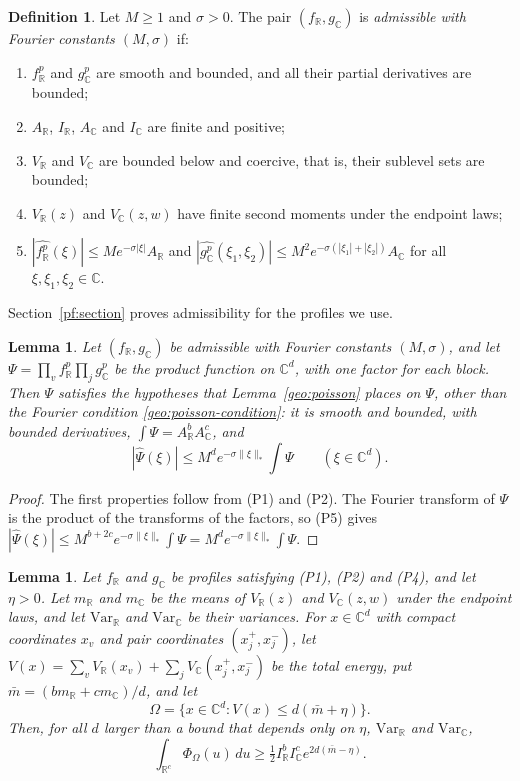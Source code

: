 \documentclass[11pt]{amsart}
\numberwithin{equation}{section}
\newtheorem{lemma}[equation]{Lemma}
\theoremstyle{definition}
\newtheorem{definition}[equation]{Definition}
\theoremstyle{remark}
\newcommand{\R}{\mathbb R}
\newcommand{\C}{\mathbb C}
\begin{document}
\begin{definition}\label{geo:admissible}
Let $M\ge1$ and $\sigma>0$. The pair $(f_\R,g_\C)$ is \emph{admissible
with Fourier constants $(M,\sigma)$} if:
\begin{enumerate}
\item[(P1)] $f_\R^p$ and $g_\C^p$ are smooth and bounded, and all their
partial derivatives are bounded;
\item[(P2)] $A_\R$, $I_\R$, $A_\C$ and $I_\C$ are finite and positive;
\item[(P3)] $V_\R$ and $V_\C$ are bounded below and coercive, that is,
their sublevel sets are bounded;
\item[(P4)] $V_\R(z)$ and $V_\C(z,w)$ have finite second moments under
the endpoint laws;
\item[(P5)] $|\widehat{f_\R^p}(\xi)|\le Me^{-\sigma|\xi|}A_\R$ and
$|\widehat{g_\C^p}(\xi_1,\xi_2)|\le M^2e^{-\sigma(|\xi_1|+|\xi_2|)}A_\C$
for all $\xi,\xi_1,\xi_2\in\C$.
\end{enumerate}
\end{definition}

Section~\ref{pf:section} proves admissibility for the profiles we use.

\begin{lemma}\label{geo:tensor}
Let $(f_\R,g_\C)$ be admissible with Fourier constants $(M,\sigma)$, and
let $\Psi=\prod_vf_\R^p\prod_jg_\C^p$ be the product function on $\C^d$,
with one factor for each block. Then $\Psi$ satisfies the hypotheses that
Lemma~\ref{geo:poisson} places on $\Psi$, other than the Fourier condition
\eqref{geo:poisson-condition}: it is smooth and bounded, with bounded
derivatives, $\int\Psi=A_\R^bA_\C^c$, and
\[
 |\widehat\Psi(\xi)|\le M^de^{-\sigma\|\xi\|_*}\int\Psi\qquad(\xi\in\C^d).
\]
\end{lemma}

\begin{proof}
The first properties follow from (P1) and (P2). The Fourier transform of
$\Psi$ is the product of the transforms of the factors, so (P5) gives
$|\widehat\Psi(\xi)|\le M^{b+2c}e^{-\sigma\|\xi\|_*}\int\Psi
=M^de^{-\sigma\|\xi\|_*}\int\Psi$.
\end{proof}

\begin{lemma}\label{geo:concentration}
Let $f_\R$ and $g_\C$ be profiles satisfying (P1), (P2) and (P4), and let
$\eta>0$. Let $m_\R$ and $m_\C$ be the means of $V_\R(z)$ and $V_\C(z,w)$
under the endpoint laws, and let $\mathrm{Var}_\R$ and $\mathrm{Var}_\C$ be
their variances. For $x\in\C^d$ with compact coordinates $x_v$ and pair
coordinates $(x_j^+,x_j^-)$, let
$V(x)=\sum_vV_\R(x_v)+\sum_jV_\C(x_j^+,x_j^-)$ be the total energy, put
$\bar m=(bm_\R+cm_\C)/d$, and let
\[
 \Omega=\bigl\{x\in\C^d:V(x)\le d(\bar m+\eta)\bigr\}.
\]
Then, for all $d$ larger than a bound that depends only on $\eta$,
$\mathrm{Var}_\R$ and $\mathrm{Var}_\C$,
\[
 \int_{\R^c}\Phi_\Omega(u)\,du\ge\tfrac12I_\R^bI_\C^ce^{2d(\bar m-\eta)}.
\]
\end{lemma}
\end{document}

